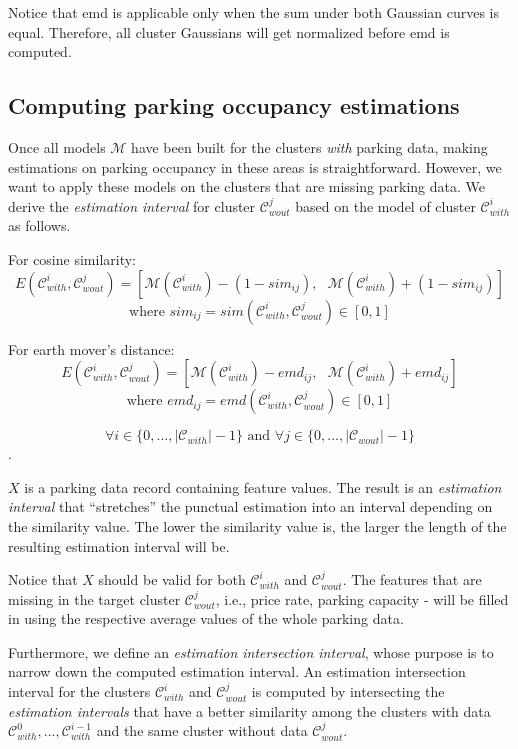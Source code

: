 \documentclass{ws-ijait}
\begin{document}
	Notice that emd is applicable only when the sum under both Gaussian curves is equal. Therefore, all cluster Gaussians will get normalized before emd is computed.
	
	\subsection{Computing parking occupancy estimations}
	Once all models $\mathcal{M}$ have been built for the clusters \textit{with} parking data, making estimations on parking occupancy in these areas is straightforward. However, we want to apply these models on the clusters that are missing parking data. We derive the \textit{estimation interval} for cluster $\mathcal{C}_{wout}^j$ based on the model of cluster $\mathcal{C}_{with}^i$ as follows.
	
	For cosine similarity:
	\begin{equation}
	E(\mathcal{C}_{with}^i,\mathcal{C}_{wout}^j) = [\mathcal{M}(\mathcal{C}_{with}^i) - (1 - sim_{ij}), \text{    } \mathcal{M}(\mathcal{C}_{with}^i) + (1 - sim_{ij})]
	\end{equation}
	$$\text{where } sim_{ij} = sim(\mathcal{C}_{with}^i,\mathcal{C}_{wout}^j) \in [0,1]$$
	
	For earth mover's distance:
	\begin{equation}
	E(\mathcal{C}_{with}^i,\mathcal{C}_{wout}^j) = [\mathcal{M}(\mathcal{C}_{with}^i) - emd_{ij},   \text{    }\mathcal{M}(\mathcal{C}_{with}^i) + emd_{ij}]
	\end{equation}
	$$\text{where } emd_{ij} = emd(\mathcal{C}_{with}^i,\mathcal{C}_{wout}^j) \in [0,1]$$
	
	$$\forall i \in \{0,...,|\mathcal{C}_{with}|-1\} \text{ and } \forall j \in \{0,...,|\mathcal{C}_{wout}|-1\}$$.
	
	$X$ is a parking data record containing feature values.
	The result is an \textit{estimation interval} that ``stretches'' the punctual estimation into an interval depending on the similarity value. The lower the similarity value is, the larger the length of the resulting estimation interval will be.
	
	Notice that $X$ should be valid for both $\mathcal{C}_{with}^i$ and $\mathcal{C}_{wout}^j$. 
	The features that are missing in the target cluster $\mathcal{C}_{wout}^j$, i.e., price rate, parking capacity - will be filled in using the respective average values of the whole parking data. 
	
	Furthermore, we define an \textit{estimation intersection interval}, whose purpose is to narrow down the computed estimation interval.
	An estimation intersection interval for the clusters $\mathcal{C}_{with}^i$ and $\mathcal{C}_{wout}^j$ is computed by intersecting the \textit{estimation intervals} that have a better similarity among the clusters with data $\mathcal{C}_{with}^{0}, ..., \mathcal{C}_{with}^{i-1}$ and the same cluster without data $\mathcal{C}_{wout}^j$.
	
\end{document}
